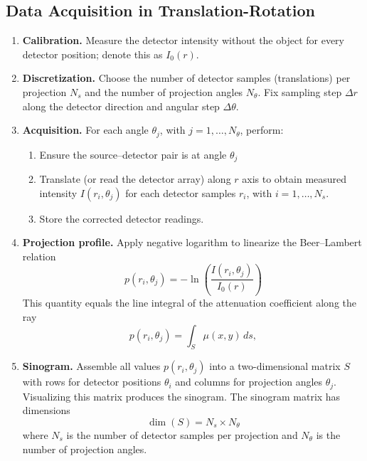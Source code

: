 \documentclass[../../../main.tex]{subfiles}
\begin{document}
\subsection{Data Acquisition in Translation-Rotation}
\begin{enumerate}
    \item \textbf{Calibration.} Measure the detector intensity without the object for every detector position; denote this as $I_0(r)$.
    \item \textbf{Discretization.} Choose the number of detector samples (translations) per projection $N_s$ and the number of projection angles $N_\theta$. Fix sampling step $\Delta r$ along the detector direction and angular step $\Delta \theta$.
    \item \textbf{Acquisition.} For each angle $\theta_j$, with $j=1,\dots,N_\theta$, perform:
    \begin{enumerate}
        \item Ensure the source–detector pair is at angle $\theta_j$
        \item Translate (or read the detector array) along $r$ axis to obtain measured intensity $I(r_i,\theta_j)$ for each detector samples $r_i$, with $i=1,\dots,N_s$.
        \item Store the corrected detector readings.
    \end{enumerate}
    \item \textbf{Projection profile.} Apply negative logarithm to linearize the Beer–Lambert relation
    \begin{equation*}
        p(r_i,\theta_j)=-\ln \left( \frac{I(r_i,\theta_j)}{I_0(r)} \right) 
    \end{equation*}
    This quantity equals the line integral of the attenuation coefficient along the ray
    \begin{equation*}
            p(r_i,\theta_j)
    = \int_{S} \mu(x,y) \, ds,
    \end{equation*}
    \item \textbf{Sinogram.} Assemble all values $p(r_i,\theta_j)$ into a two-dimensional matrix $S$ with rows for detector positions $\theta_i$ and columns for projection angles $\theta_j$. Visualizing this matrix produces the sinogram. The sinogram matrix has dimensions
    \begin{equation*}
        \dim (S)=N_s\times N_\theta
    \end{equation*}
    where $N_s$ is the number of detector samples per projection and $N_\theta$ is the number of projection angles.
\end{enumerate}
\end{document}
